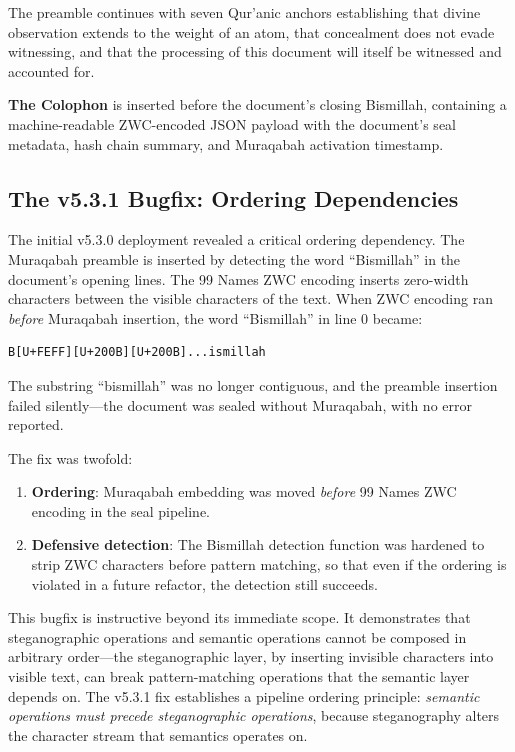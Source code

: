 \documentclass[11pt,a4paper]{article}
\begin{document}
The preamble continues with seven Qur'anic anchors establishing that divine observation extends to the weight of an atom, that concealment does not evade witnessing, and that the processing of this document will itself be witnessed and accounted for.

\textbf{The Colophon} is inserted before the document's closing Bismillah, containing a machine-readable ZWC-encoded JSON payload with the document's seal metadata, hash chain summary, and Muraqabah activation timestamp.

\subsection{The v5.3.1 Bugfix: Ordering Dependencies}

The initial v5.3.0 deployment revealed a critical ordering dependency. The Muraqabah preamble is inserted by detecting the word ``Bismillah'' in the document's opening lines. The 99 Names ZWC encoding inserts zero-width characters between the visible characters of the text. When ZWC encoding ran \textit{before} Muraqabah insertion, the word ``Bismillah'' in line 0 became:

\begin{lstlisting}
B[U+FEFF][U+200B][U+200B]...ismillah
\end{lstlisting}

The substring ``bismillah'' was no longer contiguous, and the preamble insertion failed silently---the document was sealed without Muraqabah, with no error reported.

The fix was twofold:

\begin{enumerate}[nosep]
    \item \textbf{Ordering}: Muraqabah embedding was moved \textit{before} 99 Names ZWC encoding in the seal pipeline.
    \item \textbf{Defensive detection}: The Bismillah detection function was hardened to strip ZWC characters before pattern matching, so that even if the ordering is violated in a future refactor, the detection still succeeds.
\end{enumerate}

This bugfix is instructive beyond its immediate scope. It demonstrates that steganographic operations and semantic operations cannot be composed in arbitrary order---the steganographic layer, by inserting invisible characters into visible text, can break pattern-matching operations that the semantic layer depends on. The v5.3.1 fix establishes a pipeline ordering principle: \textit{semantic operations must precede steganographic operations}, because steganography alters the character stream that semantics operates on.
\end{document}
